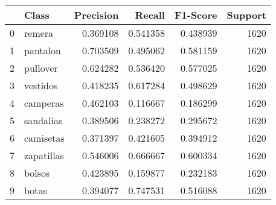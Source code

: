 \begin{tabular}{llrrrr}
\toprule
 & Class & Precision & Recall & F1-Score & Support \\
\midrule
0 & remera & 0.369108 & 0.541358 & 0.438939 & 1620 \\
1 & pantalon & 0.703509 & 0.495062 & 0.581159 & 1620 \\
2 & pullover & 0.624282 & 0.536420 & 0.577025 & 1620 \\
3 & vestidos & 0.418235 & 0.617284 & 0.498629 & 1620 \\
4 & camperas & 0.462103 & 0.116667 & 0.186299 & 1620 \\
5 & sandalias & 0.389506 & 0.238272 & 0.295672 & 1620 \\
6 & camisetas & 0.371397 & 0.421605 & 0.394912 & 1620 \\
7 & zapatillas & 0.546006 & 0.666667 & 0.600334 & 1620 \\
8 & bolsos & 0.423895 & 0.159877 & 0.232183 & 1620 \\
9 & botas & 0.394077 & 0.747531 & 0.516088 & 1620 \\
\bottomrule
\end{tabular}
